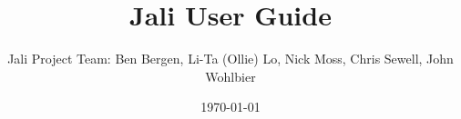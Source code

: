 
\title{Jali User Guide}
\date{\today}
\author{Jali Project Team: Ben Bergen, Li-Ta (Ollie) Lo, Nick Moss, Chris Sewell, John Wohlbier}

